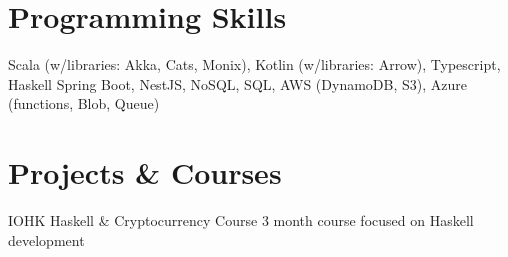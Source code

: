 \documentclass[letterpaper,11pt]{article}
\begin{document}
  \resumeSubHeadingListEnd


\section{Programming Skills}
 \resumeSubHeadingListStart
      {Scala (w/libraries: Akka, Cats, Monix), Kotlin (w/libraries: Arrow), Typescript, Haskell}
      {Spring Boot, NestJS, NoSQL, SQL, AWS (DynamoDB, S3), Azure (functions, Blob, Queue)}
 \resumeSubHeadingListEnd


\section{Projects \& Courses}
  \resumeSubHeadingListStart
    \resumeSubItemWithDetails
      {IOHK Haskell \& Cryptocurrency Course}
      {3 month course focused on Haskell development}
  \resumeSubHeadingListEnd


\end{document}
